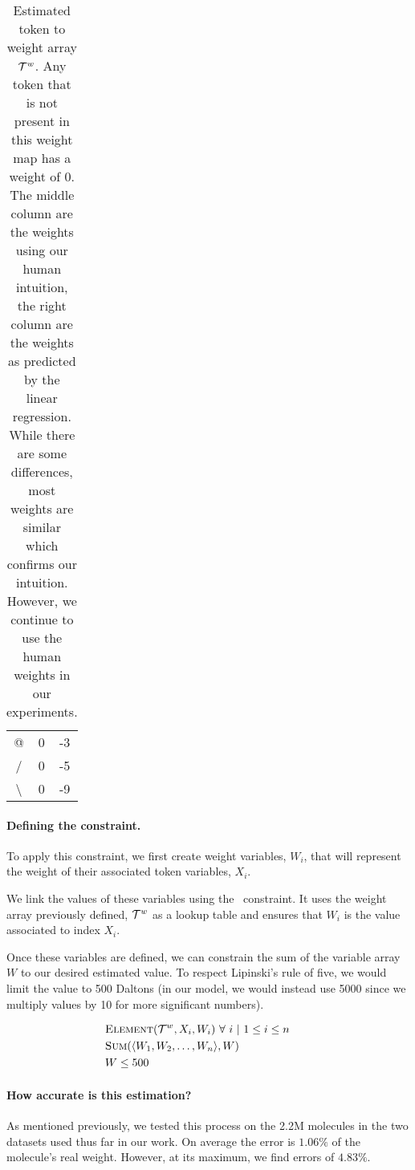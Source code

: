 \documentclass[../Document.tex]{subfiles}
\begin{document}
\begin{table}[ht]
\begin{tabular}{c|c|c}
        @ & 0 & -3\\
        / & 0 & -5\\
        \textbackslash & 0 & -9
    \end{tabular}
    \caption[Estimated token to weight array ${\cal T}^w$]{Estimated token to weight array ${\cal T}^w$. Any token that is not present in this weight map has a weight of 0. The middle column are the weights using our human intuition, the right column are the weights as predicted by the linear regression. While there are some differences, most weights are similar which confirms our intuition. However, we continue to use the human weights in our experiments.}
    \label{tab:token-weight-map}
\end{table}

\paragraph{Defining the constraint.}
To apply this constraint, we first create weight variables, $W_i$, that will represent the weight of their associated token variables, $X_i$.

We link the values of these variables using the \element\ constraint. It uses the weight array previously defined, ${\cal T}^w$ as a lookup table and ensures that $W_i$ is the value associated to index $X_i$.

Once these variables are defined, we can constrain the sum of the variable array $W$ to our desired estimated value. To respect Lipinski's rule of five, we would limit the value to 500 Daltons (in our model, we would instead use 5000 since we multiply values by 10 for more significant numbers).


\begin{align*}
    &\mbox{\sc Element}({\cal T}^w, X_i, W_i)\ \forall\ i\ \vert\ 1 \leq i \leq n \\
    &\mbox{\sc Sum}(\langle W_1, W_2,\ldots,W_n \rangle, W) & & \\
    &W \leq 500  & &
\end{align*}

\paragraph{How accurate is this estimation?}
As mentioned previously, we tested this process on the 2.2M molecules in the two datasets used thus far in our work. On average the error is $1.06\%$ of the molecule's real weight. However, at its maximum, we find errors of $4.83\%$.
\end{document}
